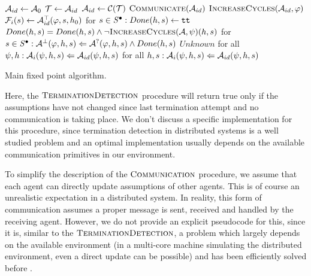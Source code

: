 \begin{algorithm}
	\begin{algorithmic}[1]
		\State $\mathcal{A}_{id} \gets \mathcal{A}_0$
		\Repeat
		\Repeat
		\Repeat
		\State $\mathcal{T} \gets \mathcal{A}_{id}$
		\State $\mathcal{A}_{id} \gets \mathcal{C}(\mathcal{T})$
		\State $\Call{Communicate}{\assume_{id}}$
		\State $\Call{IncreaseCycles}{\assume_{id}, \varphi}$
		\State $\mathcal{F}_i(s) \gets \mathcal{A}^\top_{id}(\varphi, s, h_0)$
		\EndFunction
			\State for $s \in \mathit{S}^\bullet : Done(h, s) \gets \texttt{tt} $
				\State $Done(h, s) = Done(h, s) \land \neg \Call{IncreaseCycles}{\mathcal{A}, \psi}(h, s)$
			\EndFor
			\State for $s \in \mathit{S}^\bullet : \mathcal{A}^\bot(\varphi, h, s) \Leftarrow \mathcal{A}^?(\varphi, h, s) \land Done(h,s)$
			\State \Return $Unknown$
		\EndFunction
					\State for all $\psi,h : \mathcal{A}_i(\psi, h, s) \Leftarrow \mathcal{A}_{id}(\psi, h, s)$
				\EndFor
					\State for all $h, s : \mathcal{A}_i(\psi, h, s) \Leftarrow \mathcal{A}_{id}(\psi, h, s)$
				\EndFor
			\EndFor
		\EndFunction
	\end{algorithmic}	

	\caption{Main fixed point algorithm.}
	\label{alg:main}
\end{algorithm}

Here, the $\textsc{TerminationDetection}$ procedure will return true only if the assumptions have not changed since last termination attempt and no communication is taking place. We don't discuss a specific implementation for this procedure, since termination detection in distributed systems is a well studied problem \cite{termination} and an optimal implementation usually depends on the available communication primitives in our environment.

To simplify the description of the $\textsc{Communication}$ procedure, we assume that each agent can directly update assumptions of other agents. This is of course an unrealistic expectation in a distributed system. In reality, this form of communication assumes a proper message is sent, received and handled by the receiving agent. However, we do not provide an explicit pseudocode for this, since it is, similar to the $\textsc{TerminationDetection}$, a problem which largely depends on the available environment (in a multi-core machine simulating the distributed environment, even a direct update can be possible) and has been efficiently solved before \cite{comm}.

